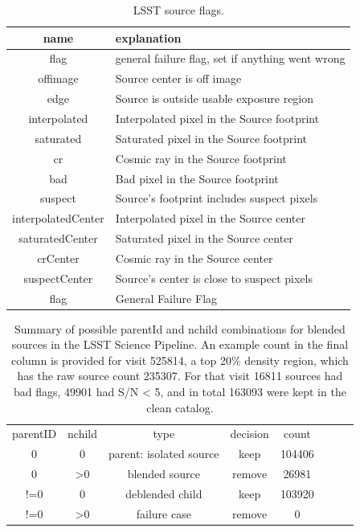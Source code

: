 \documentclass[DM,lsstdraft,toc,usenatbib]{lsstdoc}
\begin{document}
\begin{table}
\centering
\caption{LSST source flags.}
\label{tab:lsst_flags}
\begin{tabular}{cl}
\hline
name & explanation \\
\hline
flag & general failure flag, set if anything went wrong \\
offimage & Source center is off image \\
edge & Source is outside usable exposure region  \\
interpolated & Interpolated pixel in the Source footprint \\
saturated & Saturated pixel in the Source footprint \\
cr & Cosmic ray in the Source footprint \\
bad & Bad pixel in the Source footprint \\
suspect & Source's footprint includes suspect pixels \\
interpolatedCenter & Interpolated pixel in the Source center \\
saturatedCenter & Saturated pixel in the Source center \\
crCenter & Cosmic ray in the Source center \\
suspectCenter & Source's center is close to suspect pixels \\
flag & General Failure Flag \\
\hline
\end{tabular}
\end{table}


\begin{table}
\centering
\caption{Summary of possible parentId and nchild combinations for blended sources in the LSST Science Pipeline. An example count in the final column is provided for visit 525814, a top 20\% density region, which has the raw source count 235307. For that visit  16811 sources had bad flags, 49901  had S/N < 5, and in total 163093 were kept in the clean catalog.  }
\label{tab:lsst_deblend}
\begin{tabular}{cccccccc}
parentID & nchild & type  & decision &  count \\
0 & 0 & parent: isolated source & keep & 104406 \\
0 & >0 & blended source & remove & 26981 \\
!=0 & 0 & deblended child & keep  &103920\\
!=0 & >0 & failure case & remove & 0 \\
\hline
\end{tabular}
\end{table}
\end{document}
